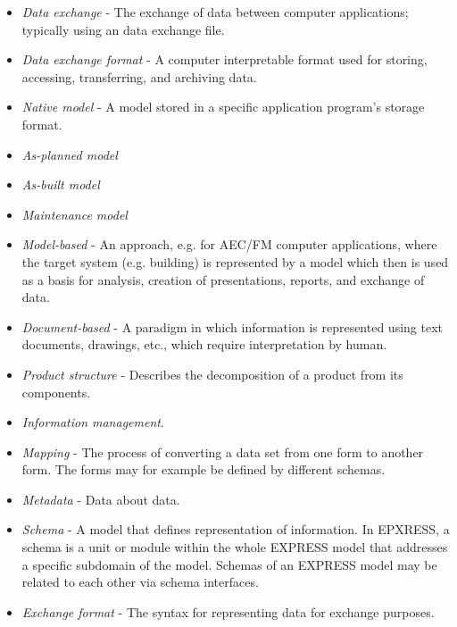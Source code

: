 \begin{itemize}
    \item \emph{Data exchange} - The exchange of data between computer applications; typically using an data exchange file. 
    \item \emph{Data exchange format} - A computer interpretable format used for storing, accessing, transferring, and archiving data.
    \item \emph{Native model} - A model stored in a specific application program's storage format.
    \item \emph{As-planned model}
    \item \emph{As-built model}
    \item \emph{Maintenance model}
    \item \emph{Model-based} - An approach, e.g. for AEC/FM computer applications, where the target system (e.g. building) is represented by a model which then is used as a basis for analysis, creation of presentations, reports, and exchange of data.
    \item \emph{Document-based} - A paradigm in which information is represented using text documents, drawings, etc., which require interpretation by human.
    \item \emph{Product structure} - Describes the decomposition of a product from its components.
    \item \emph{Information management}.

    
    \item \emph{Mapping} - The process of converting a data set from one form to another form. The forms may for example be defined by different schemas.
    \item \emph{Metadata} - Data about data.
    \item \emph{Schema} - A model that defines representation of information. In EPXRESS, a schema is a unit or module within the whole EXPRESS model that addresses a specific subdomain of the model. Schemas of an EXPRESS model may be related to each other via schema interfaces.
    
    \item \emph{Exchange format} - The  syntax for representing data for exchange purposes.


\end{itemize}
